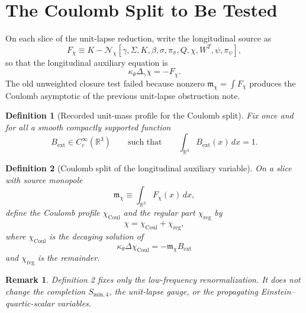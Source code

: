 \documentclass[11pt]{article}
\newtheorem{definition}{Definition}
\newtheorem{remark}{Remark}
\begin{document}
\section{The Coulomb Split to Be Tested}

On each slice of the unit-lapse reduction, write the longitudinal source as
\begin{equation}
F_\chi
\equiv
K-\mathcal N_\chi[\gamma,\Sigma,K,\beta,\sigma,\pi_\sigma,Q,\chi,W^T,\psi,\pi_\psi],
\label{eq:Fchi}
\end{equation}
so that the longitudinal auxiliary equation is
\begin{equation}
\kappa_\theta \Delta_\gamma \chi = -F_\chi.
\label{eq:chieq}
\end{equation}
The old unweighted closure test failed because nonzero \(\mathfrak m_\chi=\int F_\chi\) produces the Coulomb asymptotic of the previous unit-lapse obstruction note.

\begin{definition}[Recorded unit-mass profile for the Coulomb split]
Fix once and for all a smooth compactly supported function
\begin{equation}
B_{\mathrm{ext}}\in C_c^\infty(\mathbb R^3)
\qquad\text{such that}\qquad
\int_{\mathbb R^3} B_{\mathrm{ext}}(x)\,dx = 1.
\label{eq:Bext}
\end{equation}
\end{definition}

\begin{definition}[Coulomb split of the longitudinal auxiliary variable]
On a slice with source monopole
\begin{equation}
\mathfrak m_\chi
\equiv
\int_{\mathbb R^3}F_\chi(x)\,dx,
\label{eq:mchi}
\end{equation}
define the \emph{Coulomb profile} \(\chi_{\mathrm{Coul}}\) and the \emph{regular part} \(\chi_{\mathrm{reg}}\) by
\begin{equation}
\chi=\chi_{\mathrm{Coul}}+\chi_{\mathrm{reg}},
\label{eq:split}
\end{equation}
where \(\chi_{\mathrm{Coul}}\) is the decaying solution of
\begin{equation}
\kappa_\theta \Delta \chi_{\mathrm{Coul}}
=
-\mathfrak m_\chi B_{\mathrm{ext}}
\label{eq:chiCoul}
\end{equation}
and \(\chi_{\mathrm{reg}}\) is the remainder.
\end{definition}

\begin{remark}
Definition 2 fixes only the low-frequency renormalization. It does not change the completion \(S_{\mathrm{min},4}\), the unit-lapse gauge, or the propagating Einstein--quartic-scalar variables.
\end{remark}
\end{document}
